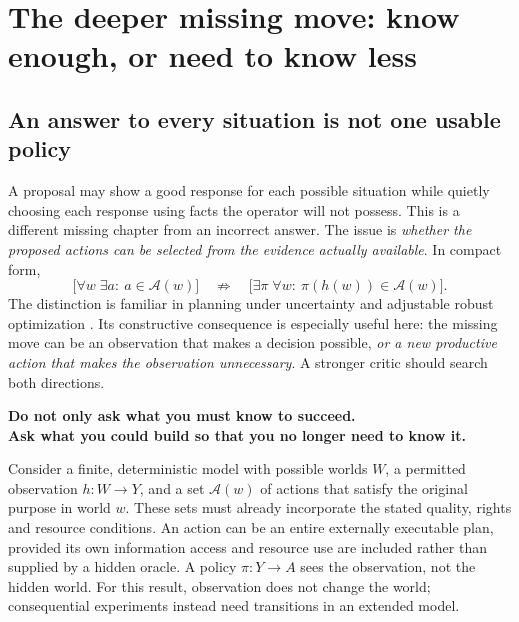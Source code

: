 \section{The deeper missing move: know enough, or need to know less}
\label{sec:decision}
\subsection{An answer to every situation is not one usable policy}
A proposal may show a good response for each possible situation while quietly choosing each response using facts the operator will not possess. This is a different missing chapter from an incorrect answer. The issue is \emph{whether the proposed actions can be selected from the evidence actually available}. In compact form,
\begin{equation}
\big[\forall w\;\exists a:\ a\in\mathcal A(w)\big]\quad\not\Longrightarrow\quad\big[\exists\pi\;\forall w:\ \pi(h(w))\in\mathcal A(w)\big].
\label{eq:quantifier}
\end{equation}
The distinction is familiar in planning under uncertainty and adjustable robust optimization \citep{bental2004adjustable}. Its constructive consequence is especially useful here: the missing move can be an observation that makes a decision possible, \emph{or a new productive action that makes the observation unnecessary}. A stronger critic should search both directions.

\begin{thesisbox}
\textbf{Do not only ask what you must know to succeed.\\Ask what you could build so that you no longer need to know it.}
\end{thesisbox}

Consider a finite, deterministic model with possible worlds $W$, a permitted observation $h:W\to Y$, and a set $\mathcal A(w)$ of actions that satisfy the original purpose in world $w$. These sets must already incorporate the stated quality, rights and resource conditions. An action can be an entire externally executable plan, provided its own information access and resource use are included rather than supplied by a hidden oracle. A policy $\pi:Y\to A$ sees the observation, not the hidden world. For this result, observation does not change the world; consequential experiments instead need transitions in an extended model.

